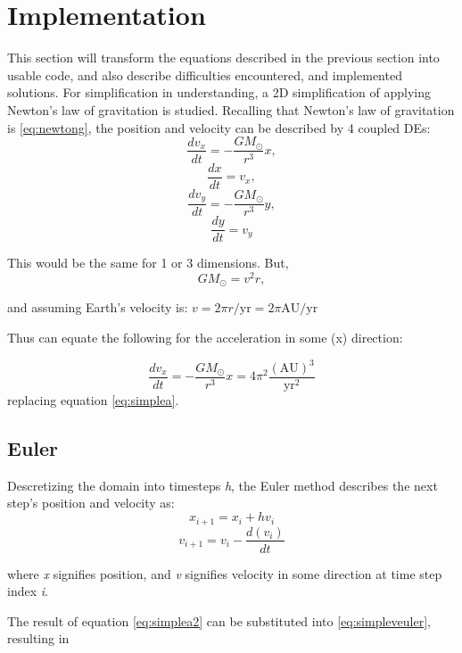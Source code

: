 \documentclass[12pt]{article} %
\begin{document}
\section{Implementation}
This section will transform the equations described in the previous section into usable code, and also describe difficulties encountered, and implemented solutions.  For simplification in understanding, a 2D simplification of applying Newton's law of gravitation is studied. Recalling that Newton's law of gravitation is
\eqref{eq:newtong}, the position and velocity can be described by 4 coupled DEs:
\begin{equation}
	\frac{dv_x}{dt}=-\frac{GM_{\odot}}{r^3}x,
	\label{eq:simplea}
\end{equation}
\begin{equation}
	\frac{dx}{dt}=v_x,
	\label{eq:simplev}
\end{equation}
\[
	\frac{dv_y}{dt}=-\frac{GM_{\odot}}{r^3}y,
\]
\[
	\frac{dy}{dt}=v_y
\]

This would be the same for 1 or 3 dimensions. But,
\[
	GM_{\odot}=v^2r,
	\]

and assuming Earth's velocity is:
$v = 2\pi r/\mathrm{yr}=2\pi\mathrm{AU}/\mathrm{yr}$

Thus can equate the following for the acceleration in some (x) direction:

\begin{equation}
	\frac{dv_x}{dt} = -\frac{GM_{\odot}}{r^3}x = 4\pi^2 \frac{(\mathrm{AU})^3}{\mathrm{yr}^2}
	\label{eq:simplea2}
\end{equation}
replacing equation \eqref{eq:simplea}.

\subsection{Euler}
Descretizing the domain into timesteps \textit{h}, the Euler method describes the next step's position and velocity as:
\begin{equation}
	x_{i+1} = x_i + hv_i
	\label{eq:simplepeuler}
\end{equation}
\begin{equation}
	v_{i+1} = v_i - \frac{d(v_i)}{dt}
	\label{eq:simpleveuler}
\end{equation}

where \textit{x} signifies position, and \textit{v} signifies velocity in some direction at time step index \textit{i}.

The result of equation \eqref{eq:simplea2} can be substituted into \eqref{eq:simpleveuler}, resulting in
\end{document}
